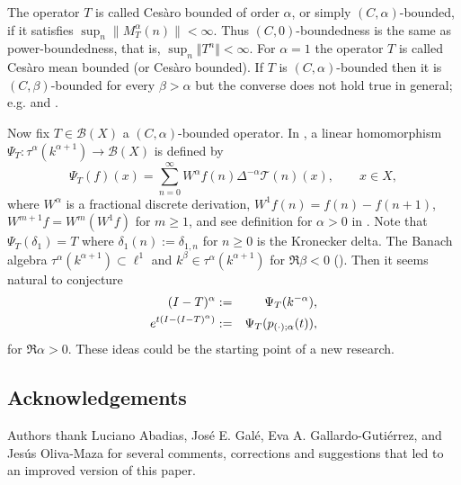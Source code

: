 \documentclass[a4paper,12pt]{amsart}
\theoremstyle{definition}
\theoremstyle{remark}
\begin{document}
The operator $T$ is called Ces\`{a}ro bounded of order $\alpha$, or simply $(C,\alpha)$-bounded, if it satisfies
$\sup_{n} \|M_T^{\alpha}(n) \| < \infty$. Thus
$(C,0)$-boundedness is the same as
power-boundedness, that is, $\sup_{n}\Vert T^n\Vert<\infty$.
For $\alpha=1$ the operator $T$ is called Ces\`{a}ro mean bounded (or Ces\`{a}ro bounded).
If $T$ is $(C,\alpha)$-bounded
then it is $(C,\beta)$-bounded for every $\beta>\alpha$ but the converse does not hold true in general;
e.g. \cite[Section 4.7]{Ed}  and  \cite[Remark 2.3]{Su-Ze13}.

Now fix $T\in {\mathcal B}(X)$ a $(C,\alpha)$-bounded operator.  In \cite[Corollary 3.7]{ALMV}, a linear homomorphism $\Psi_T: \tau^{\alpha}(k^{\alpha+1})\to {\mathcal B}(X)$ is defined by
$$
\Psi_T(f)(x)=\sum_{n=0}^\infty W^\alpha f(n) \Delta^{-\alpha} \mathcal{T}(n)(x), \qquad x\in X,
$$
where $W^\alpha$ is a fractional discrete derivation, $W^1f(n)= f(n)-f(n+1)$, $W^{m+1}f= W^{m}(W^1f)$ for $m\ge 1$, and see definition for $\alpha>0$ in  \cite{ALMV, AM2018}. Note that  $\Psi_T(\delta_1)= T$ where $\delta_1(n):=\delta_{1,n}$ for $n\ge 0$ is the  Kronecker delta. The Banach algebra $ \tau^{\alpha}(k^{\alpha+1})\subset \ell^1$ and $k^\beta\in \tau^{\alpha}(k^{\alpha+1}) $ for $\Re \beta <0$ (\cite[Lemma 5.3]{AM2018}). Then it seems natural to conjecture
\begin{eqnarray*}
    (I-T)^{\alpha}&:=& \Psi_T(k^{-\alpha}), \cr
    e^{t(I-(I-T)^{\alpha })}&:=&\Psi_T(p_{(\cdot);\alpha}(t)),
\end{eqnarray*}
for $\Re \alpha>0.$ These ideas could be the starting point of a new research.




\subsection*{Acknowledgements} Authors thank Luciano Abadias, José E. Galé, Eva A. Gallardo-Gutiérrez, and  Jes\'us Oliva-Maza for  several comments, corrections and suggestions that led to an improved version of this paper.



\end{document}
